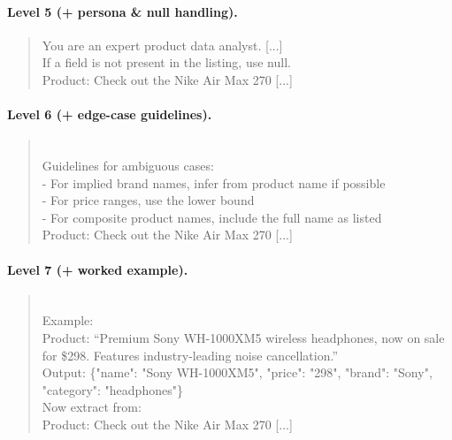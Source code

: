 \paragraph{Level 5 (+ persona \& null handling).}
\begin{quote}\small\ttfamily
You are an expert product data analyst. [...]\\[4pt]
If a field is not present in the listing, use null.\\[4pt]
Product: Check out the Nike Air Max 270 [...]
\end{quote}

\paragraph{Level 6 (+ edge-case guidelines).}
\begin{quote}\small\ttfamily
[...as L5, plus:]\\[4pt]
Guidelines for ambiguous cases:\\
- For implied brand names, infer from product name if possible\\
- For price ranges, use the lower bound\\
- For composite product names, include the full name as listed\\[4pt]
Product: Check out the Nike Air Max 270 [...]
\end{quote}

\paragraph{Level 7 (+ worked example).}
\begin{quote}\small\ttfamily
[...as L6, plus:]\\[4pt]
Example:\\
Product: ``Premium Sony WH-1000XM5 wireless headphones, now on sale for
\$298. Features industry-leading noise cancellation.''\\
Output: \{"name": "Sony WH-1000XM5", "price": "298", "brand": "Sony",
"category": "headphones"\}\\[4pt]
Now extract from:\\
Product: Check out the Nike Air Max 270 [...]
\end{quote}

